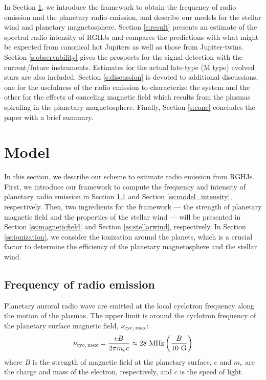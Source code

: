 \documentclass[iop,numberedappendix,apj]{emulateapj}
\begin{document}
In Section \ref{s:assumptions}, we introduce the framework to obtain the frequency of radio emission and the planetary radio emission, and describe our models for the stellar wind and planetary magnetosphere.
Section \ref{s:result} presents an estimate of the spectral radio intensity of RGHJs and compares the predictions with what might be expected from canonical hot Jupiters as well as those from Jupiter-twins.
Section \ref{s:observability} gives the prospects for the signal detection with the current/future instruments. 
Estimates for the actual late-type (M type) evolved stars are also included. 
Section \ref{s:discussion} is devoted to additional discussions, one for the usefulness of the radio emission to characterize the system and the other for the effects of canceling magnetic field which results from the plasmas spiraling in the planetary magnetosphere.  
Finally, Section \ref{s:conc} concludes the paper with a brief summary. 


\section{Model}
\label{s:assumptions}


In this section, we describe our scheme to estimate radio emission from RGHJs. 
First, we introduce our framework to compute the frequency and intensity of planetary radio emission in Section \ref{ss:model_frequency} and Section \ref{ss:model_intensity}, respectively. 
Then, two ingredients for the framework --- the strength of planetary magnetic field and the properties of the stellar wind --- will be presented in Section \ref{ss:magneticfield} and Section \ref{ss:stellarwind}, respectively. 
In Section \ref{ss:ionization}, we consider the ionization around the planets, which is a crucial factor to determine the efficiency of the planetary magnetosphere and the stellar wind. 


\subsection{Frequency of radio emission}
\label{ss:model_frequency}

Planetary auroral radio wave are emitted at the local cyclotron frequency along the motion of the plasmas.
The upper limit is around the cyclotron frequency of the planetary surface magnetic field, $\nu_{\rm cyc,\,max}$: 
\begin{equation}
\nu_{\rm cyc,\,max} = \frac{eB}{2\pi m_e c} \approx 28 {\rm~MHz} \left( \frac{B}{10 \rm~G} \right) \label{eq:fcyc}
\end{equation}
where $B$ is the strength of magnetic field at the planetary surface, $e$ and $m_e$ are the charge and mass of the electron, respectively, and $c$ is the speed of light. 
\end{document}
